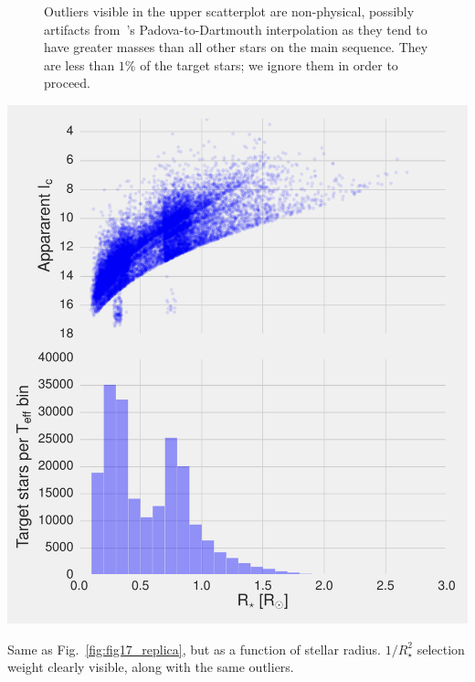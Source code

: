 \begin{figure}[!th]
{	Outliers visible in the upper scatterplot are non-physical, possibly artifacts from~'s Padova-to-Dartmouth interpolation as they tend to have greater masses than all other stars on the main sequence. They are less than $1\%$ of the target stars; we ignore them in order to proceed.
	}
\end{figure}
\begin{marginfigure}[0in]
	\includegraphics{figures/fig17_radius_on_x.pdf}
	\label{fig:fig17_radius_on_x}
	\caption{Same as Fig.~\protect\ref{fig:fig17_replica}, but as a function of stellar radius. $1/R_\star^2$ selection weight clearly visible, along with the same outliers.
	}
\end{marginfigure}

